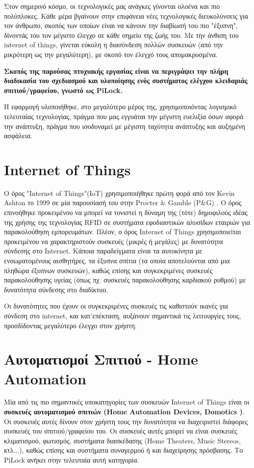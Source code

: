 Στον σημερινό κόσμο, οι τεχνολογικές μας ανάγκες γίνονται ολοένα και πιο πολύπλοκες. Κάθε μέρα βγαίνουν στην επιφάνεια νέες τεχνολογικές διευκολύνσεις για τον άνθρωπο, σκοπός των οποίων είναι να κάνουν την διαβίωσή του πιο "έξυπνη", δίνοντάς του τον μέγιστο έλεγχο σε κάθε σημείο της ζωής του. Με την άνθιση του internet of things, γίνεται εύκολη η διασύνδεση πολλών συσκευών (από την μικρότερη ως την μεγαλύτερη), με σκοπό τον έλεγχό τους απομακρυσμένα.

\textbf{Σκοπός της παρούσας πτυχιακής εργασίας είναι να περιγράψει την πλήρη διαδικασία του σχεδιασμού και υλοποίησης ενός συστήματος ελέγχου κλειδαριάς σπιτιού/γραφείου, γνωστό ως PiLock.}

Η εφαρμογή υλοποιήθηκε, στο μεγαλύτερο μέρος της, χρησιμοποιόντας λογισμικό τελευταίας τεχνολογίας, πράγμα που μας εγγυάται την μέγιστη ευελιξία όσων αφορά την ανάπτυξη, πράγμα που ισοδυναμεί με μέγιστη ταχύτητα ανάπτυξης και αυξημένη ασφάλεια. %

\section{Internet of Things}
	Ο όρος "Internet of Things"(IoT) χρησιμοποιήθηκε πρώτη φορά από τον Kevin Ashton το 1999 σε μία παρουσίασή του στην Procter \& Gamble (P\&G) \cite{iotterm}. Ο όρος επινοήθηκε προκειμένου να μπορεί να τονιστεί η δύναμη της (τότε) δημοφιλούς ιδέας της χρήσης της τεχνολογίας RFID σε συστήματα εφοδιαστικών αλυσίδων εταιριών για παρακολούθηση εμπορευμάτων. Πλέον, ο όρος Internet of Things χρησιμοποιείται προκειμένου να χαρακτηριστούν συσκευές (μικρές ή μεγάλες) με δυνατότητα σύνδεσης στο Internet. Κάποια παραδείγματα είναι τα αυτοκίνητα με ενσωματομένους αισθητήρες, τα έξυπνα σπίτια (τα οποία αποτελούνται από μια πληθώρα έξυπνων συσκευών), καθώς επίσης και συγκεκριμένες συσκευές παρακολούθησης υγείας (όπως πχ. συσκευές παρακολούθησης καρδιακού ρυθμού) με δυνατότητα σύνδεσης στο διαδίκτυο.

	Οι δυνατότητες που έχουν οι συγκεκριμένες συσκευές τις καθιστούν ικανές για σύνδεση στο internet, και κατ'επέκταση, αυξάνουν σημαντικά τις λειτουργίες τους, προσδίδοντας μεγαλύτερο έλεγχο στον χρήστη. %

\section{Αυτοματισμοί Σπιτιού - Home Automation}
	Μία από τις πιο σημαντικές υποκατηγορίες των συσκευών Internet of Things είναι οι \textbf{συσκευές αυτοματισμού σπιτιών (Home Automation Devices, Domotics \cite{domotics} )}. Οι συσκευές αυτές δίνουν στον χρήστη τους την δυνατότητα να διαχειριστεί διάφορες συσκευές του σπιτιού/γραφείου του. Οι συσκευές αυτές μπορεί να είναι συσκευές κλιματισμού, φωτισμός, συστήματα διασκέδασης (Home Theaters, Music Stereos, κτλ...), καθώς επίσης και συστήματα συναγερμού ή και διαχείρησης πρόσβασης. Το PiLock ανήκει στην τελευταία αυτή κατηγορία.

